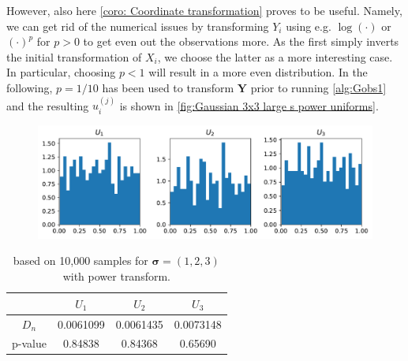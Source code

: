 \documentclass[../Thesis.tex]{subfiles}
\begin{document}
However, also here \autoref{coro: Coordinate transformation} proves to be useful. Namely, we can get rid of the numerical issues by transforming $Y_i$ using e.g. $\log(\cdot)$ or $(\cdot)^{p}$ for $p>0$ to get even out the observations more. As the first simply inverts the initial transformation of $X_i$, we choose the latter as a more interesting case. In particular, choosing $p<1$ will result in a more even distribution. In the following, $p=1/10$ has been used to transform $\boldsymbol Y$ prior to running \autoref{alg:Gobs1} and the resulting $u_i^{(j)}$ is shown in \autoref{fig:Gaussian 3x3 large s power uniforms}.
\begin{figure}[H]
    \centering
    \includegraphics[width=0.99\linewidth]{figures/ND examples/Gaussian 3x3 large s power uniforms.pdf}
    \caption{}
    \label{fig:Gaussian 3x3 large s power uniforms}
\end{figure}
\begin{table}[ht]
    \centering
    \begin{tabular}{c|c|c|c}
                & $U_1$     & $U_2$     & $U_3$     \\\hline
        $D_n$   & 0.0061099 & 0.0061435 & 0.0073148 \\
        p-value & 0.84838   & 0.84368   & 0.65690
    \end{tabular}
    \caption{based on 10,000 samples for $\boldsymbol\sigma = (1, 2, 3)$ with power transform.}
\end{table}



\end{document}
